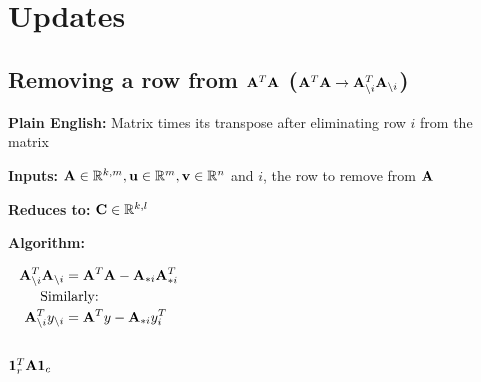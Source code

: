 \chapter{Updates}





\section{Removing a row from $\mathbf{A}^T\mathbf{A}$ ($\mathbf{A}^T\mathbf{A}\rightarrow \mathbf{A}_{\setminus i}^T\mathbf{A}_{\setminus i}$)}

\textbf{Plain English:} Matrix times its transpose after eliminating row $i$ from the matrix

\textbf{Inputs:} $\mathbf{A}\in\mathbb{R}^{k,m},\mathbf{u}\in\mathbb{R}^{m},\mathbf{v}\in\mathbb{R}^{n}$ and $i$, the row to remove from $\mathbf{A}$

\textbf{Reduces to:} $\mathbf{C}\in\mathbb{R}^{k,l}$

\textbf{Algorithm:}


\begin{align}
\mA_{\bs i}^T\mA_{\bs i} &= \mA^T\mA-\mA_{*i}\mA_{*i}^T \\
\noalign{Similarly:}
\mA_{\bs i}^T  y_{\bs i} &= \mA^Ty  -\mA_{*i}y_i^T
\end{align}


\section{$\mathbf{1}_r^T \mathbf{A} \mathbf{1}_c$}


